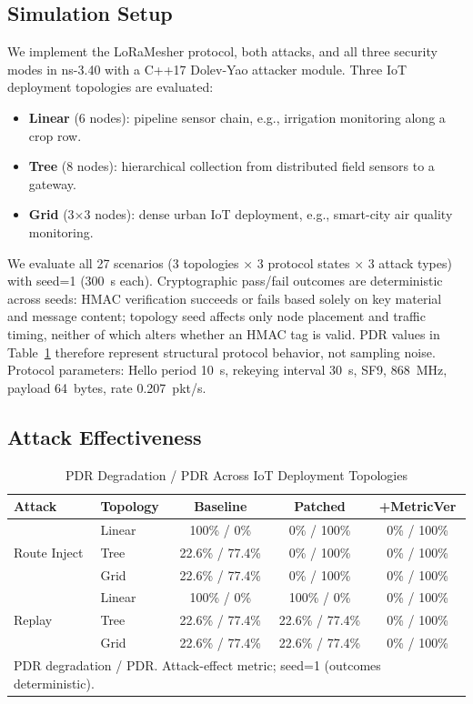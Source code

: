 \documentclass[10pt,journal,compsoc]{IEEEtran}
\begin{document}
\subsection{Simulation Setup}

We implement the LoRaMesher protocol, both attacks, and all three
security modes in ns-3.40 with a C++17 Dolev-Yao attacker module.
Three IoT deployment topologies are evaluated:

\begin{itemize}
  \item \textbf{Linear} (6 nodes): pipeline sensor chain, e.g.,
    irrigation monitoring along a crop row.
  \item \textbf{Tree} (8 nodes): hierarchical collection from
    distributed field sensors to a gateway.
  \item \textbf{Grid} (3×3 nodes): dense urban IoT deployment,
    e.g., smart-city air quality monitoring.
\end{itemize}

We evaluate all 27 scenarios (3 topologies × 3 protocol states ×
3 attack types) with seed=1 (300~s each). Cryptographic pass/fail
outcomes are deterministic across seeds: HMAC verification succeeds
or fails based solely on key material and message content; topology
seed affects only node placement and traffic timing, neither of
which alters whether an HMAC tag is valid. PDR values in
Table~\ref{tab:attacks} therefore represent structural protocol
behavior, not sampling noise. Protocol parameters: Hello period 10~s,
rekeying interval 30~s, SF9, 868~MHz, payload 64~bytes,
rate 0.207~pkt/s.

\subsection{Attack Effectiveness}

\begin{table}[t]
  \centering
  \caption{PDR Degradation / PDR Across IoT Deployment Topologies}
  \label{tab:attacks}
  \setlength{\tabcolsep}{4pt}
  \begin{tabular}{llccc}
    \toprule
    \textbf{Attack} & \textbf{Topology} &
      \textbf{Baseline} & \textbf{Patched} & \textbf{+MetricVer} \\
    \midrule
    \multirow{3}{*}{Route Inject}
      & Linear & 100\% / 0\%       & 0\% / 100\% & 0\% / 100\% \\
      & Tree   & 22.6\% / 77.4\%   & 0\% / 100\% & 0\% / 100\% \\
      & Grid   & 22.6\% / 77.4\%   & 0\% / 100\% & 0\% / 100\% \\
    \midrule
    \multirow{3}{*}{Replay}
      & Linear & 100\% / 0\%       & 100\% / 0\%      & 0\% / 100\% \\
      & Tree   & 22.6\% / 77.4\%   & 22.6\% / 77.4\%  & 0\% / 100\% \\
      & Grid   & 22.6\% / 77.4\%   & 22.6\% / 77.4\%  & 0\% / 100\% \\
    \bottomrule
    \multicolumn{5}{l}{\footnotesize PDR degradation / PDR. Attack-effect metric; seed=1 (outcomes deterministic).}
  \end{tabular}
\end{table}
\end{document}
